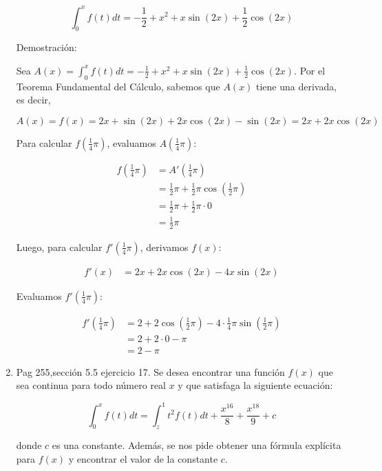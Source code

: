 \documentclass{report}
\begin{document}
\begin{enumerate}
        $$
        \int_{0}^{x} f(t) d t=-\frac{1}{2}+x^{2}+x \sin(2x)+\frac{1}{2} \cos(2x)
        $$
        
        Demostración:
        
        Sea $A(x)=\int_{0}^{x} f(t) d t=-\frac{1}{2}+x^{2}+x \sin(2x)+\frac{1}{2} \cos(2x)$. Por el Teorema Fundamental del Cálculo, sabemos que $A(x)$ tiene una derivada, es decir,
        
        $$
        A(x)=f(x)=2x+\sin(2x)+2x\cos(2x)-\sin(2x)=2x+2x\cos(2x)
        $$
        
        Para calcular $f\left(\frac{1}{4} \pi\right)$, evaluamos $A\left(\frac{1}{4} \pi\right)$:
        
        \begin{align*}
        f\left(\frac{1}{4} \pi\right) &= A'\left(\frac{1}{4} \pi\right) \\
        &= \frac{1}{2}\pi+ \frac{1}{2}\pi\cos\left(\frac{1}{2}\pi\right) \\
        &= \frac{1}{2}\pi+ \frac{1}{2}\pi\cdot 0 \\
        &= \frac{1}{2}\pi
        \end{align*}
        
        Luego, para calcular $f'\left(\frac{1}{4} \pi\right)$, derivamos $f(x)$:
        
        \begin{align*}
        f'(x) &= 2x+2x\cos(2x)-4x\sin(2x)
        \end{align*}
        
        Evaluamos $f'\left(\frac{1}{4} \pi\right)$:
        
        \begin{align*}
        f'\left(\frac{1}{4} \pi\right) &= 2+2\cos\left(\frac{1}{2}\pi\right)-4\cdot\frac{1}{4}\pi\sin\left(\frac{1}{2}\pi\right) \\
        &= 2+2\cdot 0 - \pi \\
        &= 2-\pi
        \end{align*}
        
        \item Pag 255,sección 5.5 ejercicio 17. Se desea encontrar una función $f(x)$ que sea continua para todo número real $x$ y que satisfaga la siguiente ecuación:
        
        \[
        \int_{0}^{x} f(t) dt = \int_{z}^{1} t^{2} f(t) dt + \frac{x^{16}}{8} + \frac{x^{18}}{9} + c
        \]
        
        donde $c$ es una constante. Además, se nos pide obtener una fórmula explícita para $f(x)$ y encontrar el valor de la constante $c$.
        

\end{enumerate}
\end{document}
